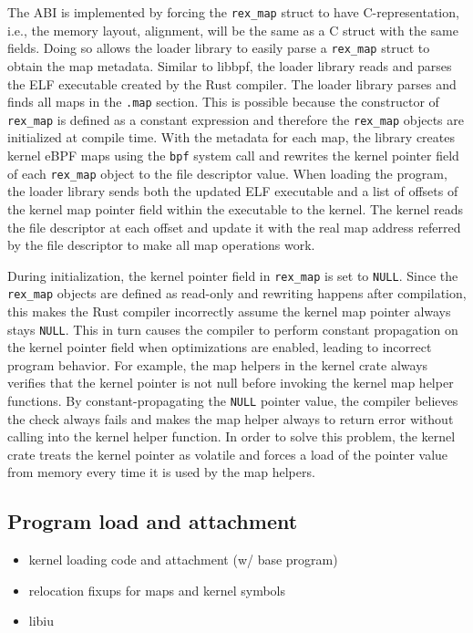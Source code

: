 The ABI is implemented by forcing the \texttt{rex\_map} struct to have
    C-representation, i.e., the memory layout, alignment, will be the same as
    a C struct with the same fields.
Doing so allows the \projname{} loader library to easily parse a
    \texttt{rex\_map} struct to obtain the map metadata.
Similar to libbpf, the \projname{} loader library reads and parses the ELF
    executable created by the Rust compiler.
The loader library parses and finds all maps in the \texttt{.map} section.
This is possible because the constructor of \texttt{rex\_map} is defined as
    a constant expression and therefore the \texttt{rex\_map} objects are
    initialized at compile time.
With the metadata for each map, the library creates kernel eBPF maps using the
    \texttt{bpf} system call and rewrites the kernel pointer field of each
    \texttt{rex\_map} object to the file descriptor value.
When loading the program, the loader library sends both the updated ELF
    executable and a list of offsets of the kernel map pointer field within the
    executable to the kernel.
The kernel reads the file descriptor at each offset and update it with the real
    map address referred by the file descriptor to make all map operations
    work.

During initialization, the kernel pointer field in \texttt{rex\_map} is set
    to \texttt{NULL}.
Since the \texttt{rex\_map} objects are defined as read-only and rewriting
    happens after compilation, this makes the Rust compiler incorrectly assume
    the kernel map pointer always stays \texttt{NULL}.
This in turn causes the compiler to perform constant propagation on the kernel
    pointer field when optimizations are enabled, leading to incorrect program
    behavior.
For example, the \projname{} map helpers in the \projname{} kernel crate always
    verifies that the kernel pointer is not null before invoking the kernel map
    helper functions.
By constant-propagating the \texttt{NULL} pointer value, the compiler believes
    the check always fails and makes the map helper always to return error
    without calling into the kernel helper function.
In order to solve this problem, the \projname{} kernel crate treats the kernel
    pointer as volatile and forces a load of the pointer value from memory
    every time it is used by the map helpers.

\subsection{Program load and attachment}
\begin{itemize}
    \item kernel loading code and attachment (w/ base program)
    \item relocation fixups for maps and kernel symbols
    \item libiu
\end{itemize}

